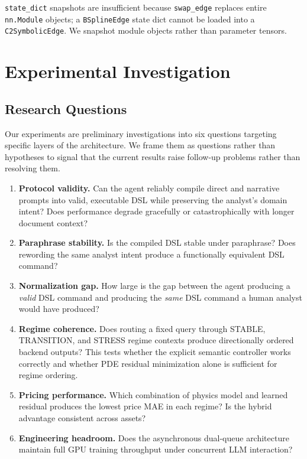 \documentclass[11pt,a4paper]{article}
\begin{document}
\texttt{state\_dict} snapshots are insufficient because \texttt{swap\_edge} replaces
entire \texttt{nn.Module} objects; a \texttt{BSplineEdge} state dict cannot be loaded
into a \texttt{C2SymbolicEdge}. We snapshot module objects rather than parameter tensors.

\section{Experimental Investigation}
\label{sec:experiments}

\subsection{Research Questions}

Our experiments are preliminary investigations into six questions targeting specific
layers of the architecture. We frame them as questions rather than hypotheses to signal
that the current results raise follow-up problems rather than resolving them.

\begin{enumerate}[label=\textbf{RQ\arabic*}]
  \item \textbf{Protocol validity.} Can the agent reliably compile direct and narrative
  prompts into valid, executable DSL while preserving the analyst's domain intent?
  Does performance degrade gracefully or catastrophically with longer document context?

  \item \textbf{Paraphrase stability.} Is the compiled DSL stable under paraphrase?
  Does rewording the same analyst intent produce a functionally equivalent DSL command?

  \item \textbf{Normalization gap.} How large is the gap between the agent producing a
  \emph{valid} DSL command and producing the \emph{same} DSL command a human analyst
  would have produced?

  \item \textbf{Regime coherence.} Does routing a fixed query through STABLE, TRANSITION,
  and STRESS regime contexts produce directionally ordered backend outputs? This tests
  whether the explicit semantic controller works correctly and whether PDE residual
  minimization alone is sufficient for regime ordering.

  \item \textbf{Pricing performance.} Which combination of physics model and learned
  residual produces the lowest price MAE in each regime? Is the hybrid advantage
  consistent across assets?

  \item \textbf{Engineering headroom.} Does the asynchronous dual-queue architecture
  maintain full GPU training throughput under concurrent LLM interaction?
\end{enumerate}
\end{document}
